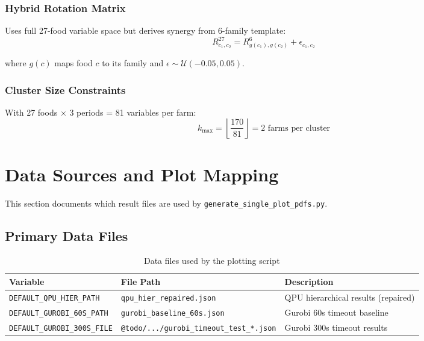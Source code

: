 \documentclass[11pt,a4paper]{article}
\begin{document}
\subsubsection{Hybrid Rotation Matrix}

Uses full 27-food variable space but derives synergy from 6-family template:
\begin{equation}
R^{27}_{c_1,c_2} = R^6_{g(c_1), g(c_2)} + \epsilon_{c_1,c_2}
\end{equation}

where $g(c)$ maps food $c$ to its family and $\epsilon \sim \mathcal{U}(-0.05, 0.05)$.

\subsubsection{Cluster Size Constraints}

With 27 foods $\times$ 3 periods = 81 variables per farm:
\begin{equation}
k_{\max} = \left\lfloor \frac{170}{81} \right\rfloor = 2 \text{ farms per cluster}
\end{equation}

\section{Data Sources and Plot Mapping}

This section documents which result files are used by \texttt{generate\_single\_plot\_pdfs.py}.

\subsection{Primary Data Files}

\begin{table}[H]
\centering
\caption{Data files used by the plotting script}
\label{tab:data_files}
\begin{adjustbox}{max width=\textwidth}
\begin{tabular}{@{}lll@{}}
\toprule
\textbf{Variable} & \textbf{File Path} & \textbf{Description} \\
\midrule
\texttt{DEFAULT\_QPU\_HIER\_PATH} & \texttt{qpu\_hier\_repaired.json} & QPU hierarchical results (repaired) \\
\texttt{DEFAULT\_GUROBI\_60S\_PATH} & \texttt{gurobi\_baseline\_60s.json} & Gurobi 60s timeout baseline \\
\texttt{DEFAULT\_GUROBI\_300S\_FILE} & \texttt{@todo/.../gurobi\_timeout\_test\_*.json} & Gurobi 300s timeout results \\
\bottomrule
\end{tabular}
\end{adjustbox}
\end{table}
\end{document}
